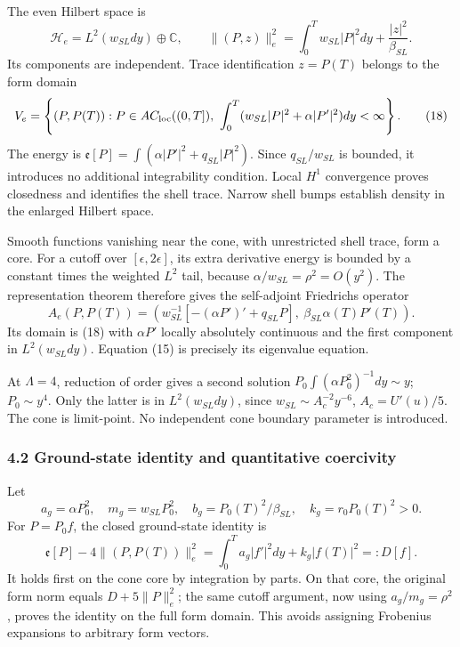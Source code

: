 \documentclass[
  11pt,
]{article}
\begin{document}
The even Hilbert space is \[
 {\mathscr H}_e=L^2(w_{SL}dy)\oplus\mathbb C,\qquad
 \|(P,z)\|_e^2=\int_0^T w_{SL}|P|^2dy+\frac{|z|^2}{\beta_{SL}}.
 \tag{17}
\] Its components are independent. Trace identification \(z=P(T)\)
belongs to the form domain \[
 V_e=\left\{(P,P(T)):
 P\in AC_{\rm loc}((0,T]),\
 \int_0^T(w_{SL}|P|^2+\alpha|P'|^2)dy<\infty\right\}.
 \tag{18}
\] The energy is \({\mathfrak e}[P]=\int(\alpha|P'|^2+q_{SL}|P|^2)\).
Since \(q_{SL}/w_{SL}\) is bounded, it introduces no additional
integrability condition. Local \(H^1\) convergence proves closedness and
identifies the shell trace. Narrow shell bumps establish density in the
enlarged Hilbert space.

Smooth functions vanishing near the cone, with unrestricted shell trace,
form a core. For a cutoff over \([\epsilon,2\epsilon]\), its extra
derivative energy is bounded by a constant times the weighted \(L^2\)
tail, because \(\alpha/w_{SL}=\rho^2=O(y^2)\). The representation
theorem therefore gives the self-adjoint Friedrichs operator \[
 A_e(P,P(T))=
 \left(w_{SL}^{-1}[-(\alpha P')'+q_{SL}P],\
       \beta_{SL}\alpha(T)P'(T)\right).                 \tag{19}
\] Its domain is (18) with \(\alpha P'\) locally absolutely continuous
and the first component in \(L^2(w_{SL}dy)\). Equation (15) is precisely
its eigenvalue equation.

At \(\Lambda=4\), reduction of order gives a second solution
\(P_0\int(\alpha P_0^2)^{-1}dy\sim y\); \(P_0\sim y^4\). Only the latter
is in \(L^2(w_{SL}dy)\), since \(w_{SL}\sim
A_c^{-2}y^{-6}\), \(A_c=U'(u)/5\). The cone is limit-point. No
independent cone boundary parameter is introduced.

\subsubsection{4.2 Ground-state identity and quantitative
coercivity}\label{ground-state-identity-and-quantitative-coercivity}

Let \[
 a_g=\alpha P_0^2,\quad m_g=w_{SL}P_0^2,\quad
 b_g=P_0(T)^2/\beta_{SL},\quad k_g=r_0P_0(T)^2>0.
 \tag{20}
\] For \(P=P_0f\), the closed ground-state identity is \[
 {\mathfrak e}[P]-4\|(P,P(T))\|_e^2
 =\int_0^T a_g|f'|^2dy+k_g|f(T)|^2=:D[f].
 \tag{21}
\] It holds first on the cone core by integration by parts. On that
core, the original form norm equals \(D+5\|P\|_e^2\); the same cutoff
argument, now using \(a_g/m_g=\rho^2\), proves the identity on the full
form domain. This avoids assigning Frobenius expansions to arbitrary
form vectors.
\end{document}
